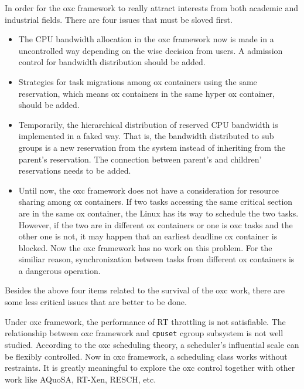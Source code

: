 In order for the oxc framework to really attract interests from both 
academic and industrial fields. There are four issues that must be 
sloved first.
\begin{itemize}
\item The CPU bandwidth allocation in the oxc framework now is made in 
a uncontrolled way depending on the wise decision from users. A admission
control for bandwidth distribution should be added.
\item Strategies for task migrations among ox containers using the same 
reservation, which means ox containers in the same hyper ox container,
should be added. 
\item Temporarily, the hierarchical distribution of reserved CPU bandwidth
is implemented in a faked way. That is, the bandwidth distributed to sub
groups is a new reservation from the system instead of inheriting from 
the parent's reservation. The connection between parent's and children' 
reservations needs to be added. 
\item Until now, the oxc framework does not have a consideration for 
resource sharing among ox containers. If two tasks accessing the same
critical section are in the same ox container, the Linux has its way
to schedule the two tasks. However, if the two are in different ox 
containers or one is oxc tasks and the other one is not, it may happen
that an earliest deadline ox container is blocked. Now the oxc framework 
has no work on this problem. For the similiar reason, synchronization
between tasks from different ox containers is a dangerous operation.
\end{itemize}
Besides the above four items related to the survival of the oxc work, 
there are some less critical issues that are better to be done.
 
Under oxc framework, the performance of RT throttling is not satisfiable.
The relationship between oxc framework and \texttt{cpuset} cgroup 
subsystem is not well studied. According to the oxc scheduling theory,
a scheduler's influential scale can be flexibly controlled. Now in oxc 
framework, a scheduling class works without restraints. It is greatly 
meaningful to explore the oxc control together with other work like AQuoSA, 
RT-Xen, RESCH, etc. 

